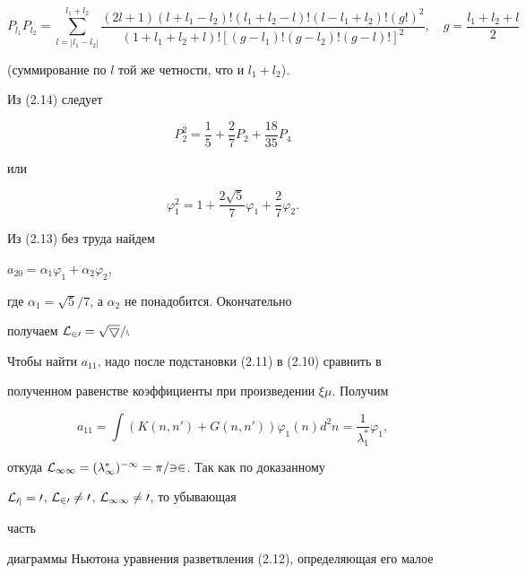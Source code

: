 \begin{equation}


P_{l_1}P_{l_2}=\sum^{l_1+l_2}_{l=|l_1-l_2|}


\frac{(2l+1)(l+l_1-l_2)!(l_1+l_2-l)!(l-l_1+l_2)!(g!)^2}


{(1+l_1+l_2+l)![(g-l_1)!(g-l_2)!(g-l)!]^2},\quad


g=\frac{l_1+l_2+l}{2}


\tag{2.14}


\end{equation}


(суммирование по $l$ той же четности, что и $l_1+l_2$).


Из (2.14) следует


\begin{equation}


P^2_2=\frac{1}{5}+\frac{2}{7}P_2+\frac{18}{35}P_4


\tag{2.15}


\end{equation}


или


$$


\varphi^2_1=1+\frac{2\sqrt{5}}{7}\varphi_1+\frac{2}{7}\varphi_2.


$$


Из (2.13) без труда найдем


$a_{20}=\alpha_1\varphi_1+\alpha_2\varphi_2$,


где $\alpha_1=\sqrt{5}/7$, а $\alpha_2$ не понадобится. Окончательно


получаем $\cal L_{20}=\sqrt{5}/7$.





Чтобы найти $a_{11}$, надо после подстановки (2.11) в (2.10) сравнить в


полученном равенстве коэффициенты при произведении $\xi\mu$. Получим


$$


a_{11}=\int (K(n,n')+G(n,n'))\varphi_1(n)d^2n=


\frac{1}{\lambda^*_1}\varphi_1,


$$


откуда $\cal L_{11}=(\lambda^*_1)^{-1}=\pi/32$. Так как по доказанному


$\cal L_{0j}=0$, $\cal L_{20}\ne 0$, $\cal L_{11}\ne 0$, то убывающая


часть


диаграммы Ньютона уравнения разветвления (2.12), определяющая его малое


